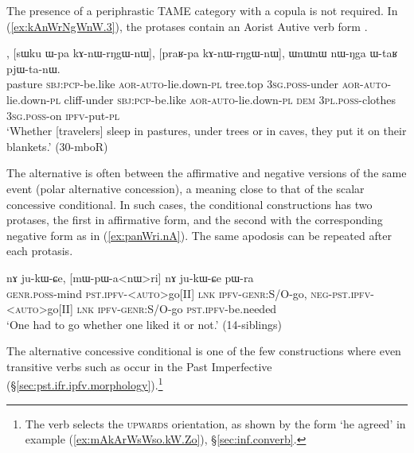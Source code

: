 The presence of a periphrastic TAME category with a copula is not required. In (\ref{ex:kAnWrNgWnW.3}), the protases contain an Aorist Autive verb form .

\begin{exe}
\ex \label{ex:kAnWrNgWnW.3}
, [sɯku ɯ-pa kɤ-nɯ-rŋgɯ-nɯ], [praʁ-pa kɤ-nɯ-rŋgɯ-nɯ], ɯnɯnɯ nɯ-ŋga ɯ-taʁ pjɯ-ta-nɯ. \\
pasture \textsc{sbj}:\textsc{pcp}-be.like \textsc{aor}-\textsc{auto}-lie.down-\textsc{pl} tree.top \textsc{3sg}.\textsc{poss}-under  \textsc{aor}-\textsc{auto}-lie.down-\textsc{pl} cliff-under \textsc{sbj}:\textsc{pcp}-be.like \textsc{aor}-\textsc{auto}-lie.down-\textsc{pl} \textsc{dem} \textsc{3pl}.\textsc{poss}-clothes \textsc{3sg}.\textsc{poss}-on \textsc{ipfv}-put-\textsc{pl} \\
\glt `Whether [travelers] sleep in pastures, under trees or in caves, they put it on their blankets.' (30-mboR)
\end{exe} 

The alternative is often between the affirmative and negative versions of the same event (polar alternative concession), a meaning close to that of the scalar concessive conditional. In such cases, the conditional constructions has two protases, the first in affirmative form, and the second with the corresponding negative form as in (\ref{ex:panWri.nA}). The same apodosis can be repeated after each protasis.
 

\begin{exe}
\ex \label{ex:panWri.nA}
\gll [tɯ-sɯm pɯ-a<nɯ>ri] nɤ ju-kɯ-ɕe, [mɯ-pɯ-a<nɯ>ri] nɤ ju-kɯ-ɕe pɯ-ra \\
\textsc{genr}.\textsc{poss}-mind \textsc{pst}.\textsc{ipfv}-<\textsc{auto}>go[II] \textsc{lnk} \textsc{ipfv}-\textsc{genr}:S/O-go, \textsc{neg}-\textsc{pst}.\textsc{ipfv}-<\textsc{auto}>go[II] \textsc{lnk} \textsc{ipfv}-\textsc{genr}:S/O-go \textsc{pst}.\textsc{ipfv}-be.needed \\
\glt `One had to go whether one liked it or not.' (14-siblings)
\end{exe} 
 
The alternative concessive conditional is one of the few constructions where even transitive verbs such as  occur in the Past Imperfective (§\ref{sec:pst.ifr.ipfv.morphology}).\footnote{The verb  selects the \textsc{upwards} orientation, as shown by the form  `he agreed' in example (\ref{ex:mAkArWsWso.kW.Zo}), §\ref{sec:inf.converb}. } 


